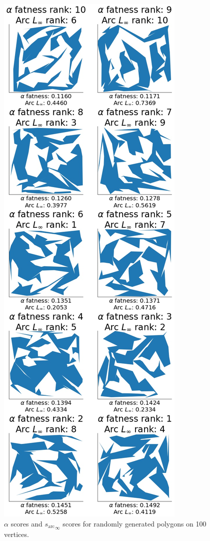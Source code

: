 \documentclass[]{jocg}
\newcommand{\chordarc}{{s_{\textrm{arc}}}}
\theoremstyle{definition}
\theoremstyle{remark}
\begin{document}
\begin{figure}[t]
  \centering
  \includegraphics[height=0.8\textheight]{../plots/u_100_alpha_score_chord_arc_infinity_vertices_0-05_delta_ranking.jpg}
  \caption{$\alpha$ scores and ${\chordarc}_{\infty}$ scores for randomly
  generated polygons on 100 vertices.}
  \label{fig:alph-inft-100}
\end{figure}
\end{document}
